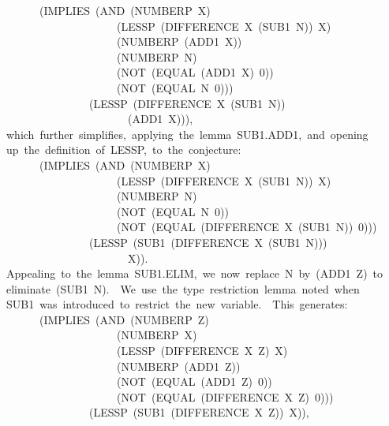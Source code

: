 \documentclass[10pt]{book}
\newenvironment{pubasis}{\begin{flushleft}}{\end{flushleft}}
\begin{document}
\begin{pubasis}
~~~~~~~~(IMPLIES~(AND~(NUMBERP~X)\\
~~~~~~~~~~~~~~~~~~~~~~(LESSP~(DIFFERENCE~X~(SUB1~N))~X)\\
~~~~~~~~~~~~~~~~~~~~~~(NUMBERP~(ADD1~X))\\
~~~~~~~~~~~~~~~~~~~~~~(NUMBERP~N)\\
~~~~~~~~~~~~~~~~~~~~~~(NOT~(EQUAL~(ADD1~X)~0))\\
~~~~~~~~~~~~~~~~~~~~~~(NOT~(EQUAL~N~0)))\\
~~~~~~~~~~~~~~~~~(LESSP~(DIFFERENCE~X~(SUB1~N))\\
~~~~~~~~~~~~~~~~~~~~~~~~(ADD1~X))),\\

~~which~further~simplifies,~applying~the~lemma~SUB1.ADD1,~and~opening\\
~~up~the~definition~of~LESSP,~to~the~conjecture:\\

~~~~~~~~(IMPLIES~(AND~(NUMBERP~X)\\
~~~~~~~~~~~~~~~~~~~~~~(LESSP~(DIFFERENCE~X~(SUB1~N))~X)\\
~~~~~~~~~~~~~~~~~~~~~~(NUMBERP~N)\\
~~~~~~~~~~~~~~~~~~~~~~(NOT~(EQUAL~N~0))\\
~~~~~~~~~~~~~~~~~~~~~~(NOT~(EQUAL~(DIFFERENCE~X~(SUB1~N))~0)))\\
~~~~~~~~~~~~~~~~~(LESSP~(SUB1~(DIFFERENCE~X~(SUB1~N)))\\
~~~~~~~~~~~~~~~~~~~~~~~~X)).\\

~~Appealing~to~the~lemma~SUB1.ELIM,~we~now~replace~N~by~(ADD1~Z)~to\\
~~eliminate~(SUB1~N).~~We~use~the~type~restriction~lemma~noted~when\\
~~SUB1~was~introduced~to~restrict~the~new~variable.~~This~generates:\\

~~~~~~~~(IMPLIES~(AND~(NUMBERP~Z)\\
~~~~~~~~~~~~~~~~~~~~~~(NUMBERP~X)\\
~~~~~~~~~~~~~~~~~~~~~~(LESSP~(DIFFERENCE~X~Z)~X)\\
~~~~~~~~~~~~~~~~~~~~~~(NUMBERP~(ADD1~Z))\\
~~~~~~~~~~~~~~~~~~~~~~(NOT~(EQUAL~(ADD1~Z)~0))\\
~~~~~~~~~~~~~~~~~~~~~~(NOT~(EQUAL~(DIFFERENCE~X~Z)~0)))\\
~~~~~~~~~~~~~~~~~(LESSP~(SUB1~(DIFFERENCE~X~Z))~X)),\\


\end{pubasis}
\end{document}
